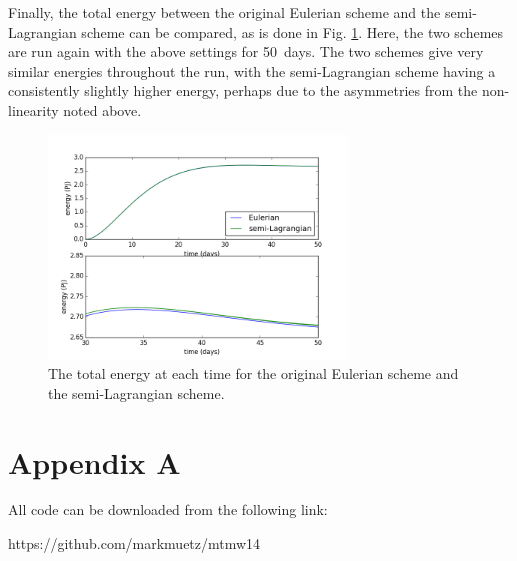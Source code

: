\documentclass{article}
\begin{document}
Finally, the total energy between the original Eulerian scheme and the semi-Lagrangian scheme can be
compared, as is done in Fig. \ref{fig:task_d_energy}. Here, the two schemes are run again with the
above settings for \SI{50}{days}. The two schemes give very similar energies throughout the run,
with the semi-Lagrangian scheme having a consistently slightly higher energy, perhaps due to the
asymmetries from the non-linearity noted above.

\begin{figure}[ht!]
    \centering
    \includegraphics[width=300px]{figures/task_d_energy}
    \caption{The total energy at each time for the original Eulerian scheme and the semi-Lagrangian
    scheme.}
    \label{fig:task_d_energy}
\end{figure}


\printbibliography[title={References}]

\section*{Appendix A}

All code can be downloaded from the following link:

https://github.com/markmuetz/mtmw14
\end{document}
